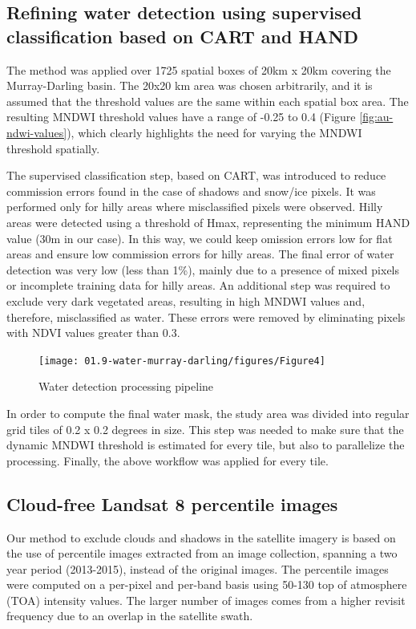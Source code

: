 \subsection{Refining water detection using supervised classification based on CART and HAND}
The method was applied over 1725 spatial boxes of 20km x 20km covering the Murray-Darling basin. The 20x20 km area was chosen arbitrarily, and it is assumed that the threshold values are the same within each spatial box area. The resulting \gls{MNDWI} threshold values have a range of -0.25 to 0.4 (Figure \ref{fig:au-ndwi-values}), which clearly highlights the need for varying the \gls{MNDWI} threshold spatially. 

The supervised classification step, based on \gls{CART}, was introduced to reduce commission errors found in the case of shadows and snow/ice pixels. It was performed only for hilly areas where misclassified pixels were observed. Hilly areas were detected using a threshold of Hmax, representing the minimum \gls{HAND} value (30m in our case). In this way, we could keep omission errors low for flat areas and ensure low commission errors for hilly areas. The final error of water detection was very low (less than 1\%), mainly due to a presence of mixed pixels or incomplete training data for hilly areas. An additional step was required to exclude very dark vegetated areas, resulting in high \gls{MNDWI} values and, therefore, misclassified as water. These errors were removed by eliminating pixels with \gls{NDVI} values greater than 0.3.

\begin{figure}
	\centering
	\texttt{[image: 01.9-water-murray-darling/figures/Figure4]}
	\caption{Water detection processing pipeline}
	\label{fig:au-pipeline}
\end{figure}

In order to compute the final water mask, the study area was divided into regular grid tiles of 0.2 x 0.2 degrees in size. This step was needed to make sure that the dynamic \gls{MNDWI} threshold is estimated for every tile, but also to parallelize the processing. Finally, the above workflow was applied for every tile.

\subsection{Cloud-free Landsat 8 percentile images}
Our method to exclude clouds and shadows in the satellite imagery is based on the use of percentile images extracted from an image collection, spanning a two year period (2013-2015), instead of the original images. The percentile images were computed on a per-pixel and per-band basis using 50-130 top of atmosphere (TOA) intensity values. The larger number of images comes from a higher revisit frequency due to an overlap in the satellite swath. 

